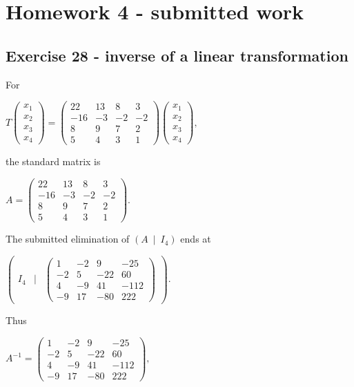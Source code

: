 \section{Homework 4 - submitted work}

\subsection{Exercise 28 - inverse of a linear transformation}

For

\(T\begin{pmatrix}
x_{1} \\
x_{2} \\
x_{3} \\
x_{4}
\end{pmatrix} = \begin{pmatrix}
22 & 13 & 8 & 3 \\
{- 16} & {- 3} & {- 2} & {- 2} \\
8 & 9 & 7 & 2 \\
5 & 4 & 3 & 1
\end{pmatrix}\begin{pmatrix}
x_{1} \\
x_{2} \\
x_{3} \\
x_{4}
\end{pmatrix},\)

the standard matrix is

\(A = \begin{pmatrix}
22 & 13 & 8 & 3 \\
{- 16} & {- 3} & {- 2} & {- 2} \\
8 & 9 & 7 & 2 \\
5 & 4 & 3 & 1
\end{pmatrix}.\)

The submitted elimination of \(\left( A\  \middle| \ I_{4} \right)\) ends at

\(\begin{pmatrix}
I_{4} & | & \begin{pmatrix}
1 & {- 2} & 9 & {- 25} \\
{- 2} & 5 & {- 22} & 60 \\
4 & {- 9} & 41 & {- 112} \\
{- 9} & 17 & {- 80} & 222
\end{pmatrix}
\end{pmatrix}.\)

Thus

\(A^{- 1} = \begin{pmatrix}
1 & {- 2} & 9 & {- 25} \\
{- 2} & 5 & {- 22} & 60 \\
4 & {- 9} & 41 & {- 112} \\
{- 9} & 17 & {- 80} & 222
\end{pmatrix},\)

